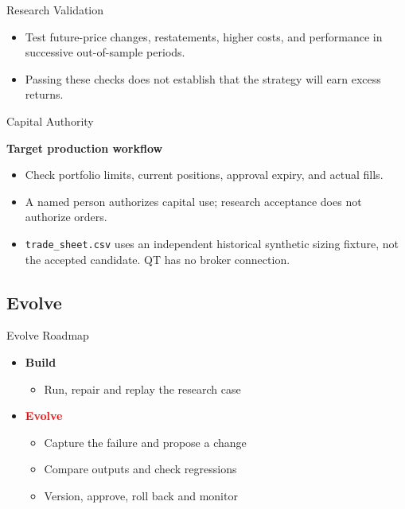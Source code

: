 \begin{frame}{Research Validation}
\begin{center}
\resizebox{.94\textwidth}{!}{}
\end{center}
\begin{itemize}
\item Test future-price changes, restatements, higher costs, and performance in successive out-of-sample periods.
\item Passing these checks does not establish that the strategy will earn excess returns.
\end{itemize}
\end{frame}

\begin{frame}{Capital Authority}
\begin{center}
{\small\textbf{Target production workflow}}\par\smallskip
\resizebox{.94\textwidth}{!}{}
\end{center}
\begin{itemize}
\item Check portfolio limits, current positions, approval expiry, and actual fills.
\item A named person authorizes capital use; research acceptance does not authorize orders.
\item \texttt{trade\_sheet.csv} uses an independent historical synthetic sizing fixture, not the accepted candidate. QT has no broker connection.
\end{itemize}
\end{frame}

\subsection{Evolve}

\begin{frame}{Evolve Roadmap}
\begin{itemize}
\item \textcolor{black!55}{\textbf{Build}}
\begin{itemize}
\item \textcolor{black!55}{Run, repair and replay the research case}
\end{itemize}
\item \textcolor{red}{\textbf{Evolve}}
\begin{itemize}
\item Capture the failure and propose a change
\item Compare outputs and check regressions
\item Version, approve, roll back and monitor
\end{itemize}
\end{itemize}
\end{frame}

